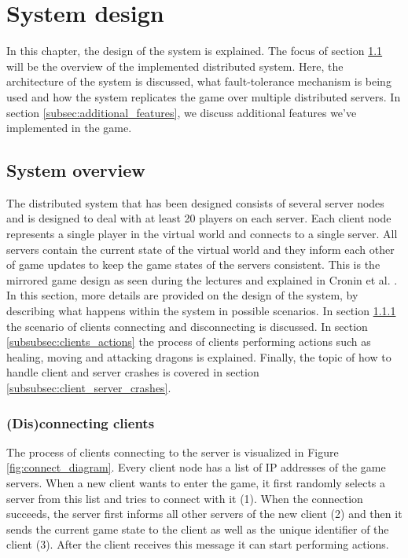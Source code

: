 \section{System design}
In this chapter, the design of the system is explained. The focus of section \ref{subsec:system_overview} will be the overview of the implemented distributed system.
Here, the architecture of the system is discussed, what fault-tolerance mechanism is being used and how the system replicates the game over multiple distributed servers. 
In section \ref{subsec:additional_features}, we discuss additional features we've implemented in the game.

\subsection{System overview}
\label{subsec:system_overview}
The distributed system that has been designed consists of several server nodes and is designed to deal with at least 20 players on each server. 
Each client node represents a single player in the virtual world and connects to a single server.
All servers contain the current state of the virtual world and they inform each other of game updates to keep the game states of the servers consistent. 
This is the mirrored game design as seen during the lectures and explained in Cronin et al. \cite{cronin2002efficient}. 
In this section, more details are provided on the design of the system, by describing what happens within the system in possible scenarios. 
In section \ref{subsubsec:disconnecting_clients} the scenario of clients connecting and disconnecting is discussed. 
In section \ref{subsubsec:clients_actions} the process of clients performing actions such as healing, moving and attacking dragons is explained. 
Finally, the topic of how to handle client and server crashes is covered in section \ref{subsubsec:client_server_crashes}.

\subsubsection{(Dis)connecting clients}
\label{subsubsec:disconnecting_clients}
The process of clients connecting to the server is visualized in Figure \ref{fig:connect_diagram}. 
Every client node has a list of IP addresses of the game servers. When a new client wants to enter the game, it first randomly selects a server from this list and tries to connect with it (1). 
When the connection succeeds, the server first informs all other servers of the new client (2) and then it sends the current game state to the client as well as the unique identifier of the client (3). 
After the client receives this message it can start performing actions.

